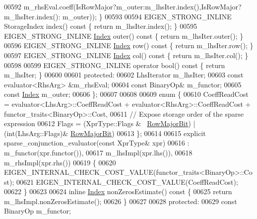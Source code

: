 \begin{DoxyCode}
00592                        m\_rhsEval.coeff(IsRowMajor?m\_outer:m\_lhsIter.index(),IsRowMajor?m\_lhsIter.index():
      m\_outer)); \}
00593 
00594     EIGEN\_STRONG\_INLINE StorageIndex index()\textcolor{keyword}{ const }\{ \textcolor{keywordflow}{return} m\_lhsIter.index(); \}
00595     EIGEN\_STRONG\_INLINE \hyperlink{namespace_eigen_a62e77e0933482dafde8fe197d9a2cfde}{Index} outer()\textcolor{keyword}{ const }\{ \textcolor{keywordflow}{return} m\_lhsIter.outer(); \}
00596     EIGEN\_STRONG\_INLINE \hyperlink{namespace_eigen_a62e77e0933482dafde8fe197d9a2cfde}{Index} row()\textcolor{keyword}{ const }\{ \textcolor{keywordflow}{return} m\_lhsIter.row(); \}
00597     EIGEN\_STRONG\_INLINE \hyperlink{namespace_eigen_a62e77e0933482dafde8fe197d9a2cfde}{Index} col()\textcolor{keyword}{ const }\{ \textcolor{keywordflow}{return} m\_lhsIter.col(); \}
00598 
00599     EIGEN\_STRONG\_INLINE \textcolor{keyword}{operator} bool()\textcolor{keyword}{ const }\{ \textcolor{keywordflow}{return} m\_lhsIter; \}
00600     
00601   \textcolor{keyword}{protected}:
00602     LhsIterator m\_lhsIter;
00603     \textcolor{keyword}{const} evaluator<RhsArg> &m\_rhsEval;
00604     \textcolor{keyword}{const} BinaryOp& m\_functor;
00605     \textcolor{keyword}{const} \hyperlink{namespace_eigen_a62e77e0933482dafde8fe197d9a2cfde}{Index} m\_outer;
00606   \};
00607   
00608   
00609   \textcolor{keyword}{enum} \{
00610     CoeffReadCost = evaluator<LhsArg>::CoeffReadCost + evaluator<RhsArg>::CoeffReadCost + 
      functor\_traits<BinaryOp>::Cost,
00611     \textcolor{comment}{// Expose storage order of the sparse expression}
00612     Flags = (XprType::Flags & ~\hyperlink{group__flags_gae4f56c2a60bbe4bd2e44c5b19cbe8762}{RowMajorBit}) | (\textcolor{keywordtype}{int}(LhsArg::Flags)&
      \hyperlink{group__flags_gae4f56c2a60bbe4bd2e44c5b19cbe8762}{RowMajorBit})
00613   \};
00614   
00615   \textcolor{keyword}{explicit} sparse\_conjunction\_evaluator(\textcolor{keyword}{const} XprType& xpr)
00616     : m\_functor(xpr.functor()),
00617       m\_lhsImpl(xpr.lhs()), 
00618       m\_rhsImpl(xpr.rhs())  
00619   \{
00620     EIGEN\_INTERNAL\_CHECK\_COST\_VALUE(functor\_traits<BinaryOp>::Cost);
00621     EIGEN\_INTERNAL\_CHECK\_COST\_VALUE(CoeffReadCost);
00622   \}
00623   
00624   \textcolor{keyword}{inline} \hyperlink{namespace_eigen_a62e77e0933482dafde8fe197d9a2cfde}{Index} nonZerosEstimate()\textcolor{keyword}{ const }\{
00625     \textcolor{keywordflow}{return} m\_lhsImpl.nonZerosEstimate();
00626   \}
00627 
00628 \textcolor{keyword}{protected}:
00629   \textcolor{keyword}{const} BinaryOp m\_functor;

\end{DoxyCode}
